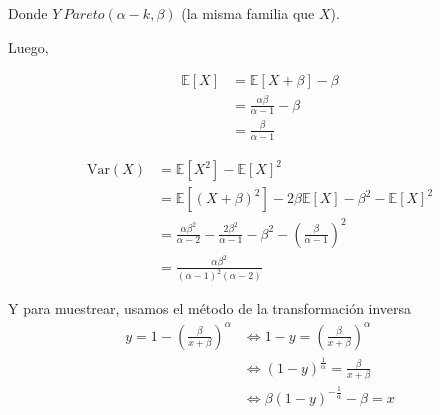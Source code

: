 \documentclass[]{article}
\begin{document}
Donde \(Y~Pareto(\alpha-k, \beta)\) (la misma familia que \(X\)).

Luego,

\[
\begin{align}
\mathbb{E}[X] &=  \mathbb{E}[X+\beta]-\beta \\
&= \frac{\alpha\beta}{\alpha-1} - \beta  \\
&= \frac{\beta}{\alpha-1}
\end{align}
\]

\[
\begin{align}
\mathrm{Var}(X) &= \mathbb{E}[X^2]-\mathbb{E}[X]^2 \\
&=  \mathbb{E}[(X+\beta)^2] - 2\beta\mathbb{E}[X] - \beta^2 - \mathbb{E}[X]^2 \\ 
&=\frac{\alpha \beta^2}{\alpha-2} - \frac{2\beta^2}{\alpha-1} - \beta^2 -\left( \frac{\beta}{\alpha-1}\right)^2 \\ 
&= \frac{\alpha \beta^2}{(\alpha-1)^2(\alpha-2)}
\end{align}
\]

Y para muestrear, usamos el método de la transformación inversa \[
\begin{align}
y=1-\left( \frac{\beta}{x+\beta} \right)^\alpha &\Leftrightarrow 1-y=\left( \frac{\beta}{x+\beta} \right)^\alpha \\
&\Leftrightarrow (1-y)^{\frac{1}{\alpha}} = \frac{\beta}{x+\beta} \\
&\Leftrightarrow \beta (1-y)^{-\frac{1}{\alpha}} - \beta = x
\end{align}
\]
\end{document}

